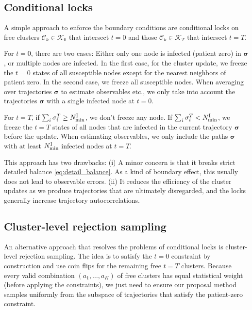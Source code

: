 \documentclass[english,10pt,aps,pra,twocolumn,superscriptaddress,floatfix,fleqn]{revtex4-2}
\newcommand{\mc}[1]{\mathcal{#1}}
\renewcommand{\vec}[1]{{\boldsymbol{#1}}}
\newcommand{\C} {\mc{C}}
\newcommand{\K} {\mc{K}}
\newcommand{\vs}{\vec{\sigma}}
\newcommand{\tI}{\textnormal{I}}
\begin{document}
\subsection{Conditional locks}\label{sec:BC-locks}
A simple approach to enforce the boundary conditions are conditional locks on free clusters $\C_k\in\K_0$ that intersect $t=0$ and those $\C_k\in\K_T$ that intersect $t=T$.

For $t=0$, there are two cases: Either only one node is infected (patient zero) in $\vs$, or multiple nodes are infected. In the first case, for the cluster update, we freeze the $t=0$ states of all susceptible nodes except for the nearest neighbors of patient zero. In the second case, we freeze all susceptible nodes. When averaging over trajectories $\vs$ to estimate observables etc., we only take into account the trajectories $\vs$ with a single infected node at $t=0$.

For $t=T$, if $\sum_i \sigma_i^T\geq N^\tI_{\min}$, we don't freeze any node. If $\sum_i \sigma_i^T<N^\tI_{\min}$, we freeze the $t=T$ states of all nodes that are infected in the current trajectory $\vs$ before the update. When estimating observables, we only include the paths $\vs$ with at least $N^\tI_{\min}$ infected nodes at $t=T$.

This approach has two drawbacks: (i) A minor concern is that it breaks strict detailed balance \eqref{eq:detail_balance}. As a kind of boundary effect, this usually does not lead to observable errors. (ii) It reduces the efficiency of the cluster updates as we produce trajectories that are ultimately disregarded, and the locks generally increase trajectory autocorrelations.

\subsection{Cluster-level rejection sampling}\label{sec:BC-clusterRejection}
An alternative approach that resolves the problems of conditional locks is cluster-level rejection sampling. The idea is to satisfy the $t=0$ constraint by construction and use coin flips for the remaining free $t=T$ clusters. Because every valid combination $(a_1,\dotsc,a_K)$ of free clusters has equal statistical weight (before applying the constraints), we just need to ensure our proposal method samples uniformly from the subspace of trajectories that satisfy the patient-zero constraint.
\end{document}
